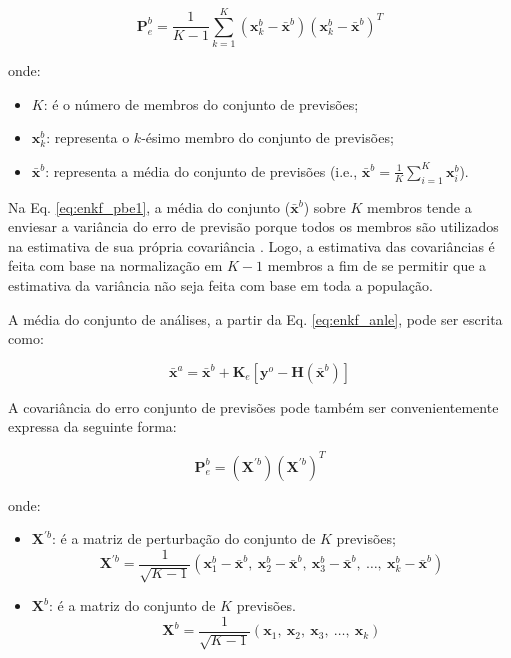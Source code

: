 \begin{equation}
    \label{eq:enkf_pbe1}
    {\mathbf{P}^{b}_{e}} = \frac{1}{K-1}\sum_{k=1}^{K}({\mathbf{x}^{b}_{k}}-\mathbf{\bar{x}}^{b})({\mathbf{x}^{b}_{k}}-\mathbf{\bar{x}}^{b})^{T}
\end{equation}

onde:

\begin{itemize}
    \item $K$: é o número de membros do conjunto de previsões;
    \item ${\mathbf{x}^{b}_{k}}$: representa o $k$-ésimo membro do conjunto de previsões;
    \item $\mathbf{\bar{x}}^{b}$: representa a média do conjunto de previsões (i.e., $\mathbf{\bar{x}}^{b} =  \frac{1}{K}\sum_{i=1}^{K}\mathbf{x}^{b}_{i}$).
\end{itemize}

Na Eq. \ref{eq:enkf_pbe1}, a média do conjunto ($\mathbf{\bar{x}}^{b}$) sobre $K$ membros tende a enviesar a variância do erro de previsão porque todos os membros são utilizados na estimativa de sua própria covariância \cite{kalnay/2003}. Logo, a estimativa das covariâncias é feita com base na normalização em $K-1$ membros a fim de se permitir que a estimativa da variância não seja feita com base em toda a população. 

A média do conjunto de análises, a partir da Eq. \ref{eq:enkf_anle}, pode ser escrita como:

\begin{equation}
    \label{eq:enkf_anlmed}
    {\mathbf{{\bar{x}}}^{a}} = {\mathbf{{\bar{x}}}^{b}} + \mathbf{K}_{e}[\mathbf{y}^{o}-\mathbf{H}(\mathbf{\bar{x}}^{b})]
\end{equation}

A covariância do erro conjunto de previsões pode também ser convenientemente expressa da seguinte forma:

\begin{equation}
    \label{eq:enkf_pbe2}
    {\mathbf{P}^{b}_{e}} = (\mathbf{X}^{\prime{b}})(\mathbf{X}^{\prime{b}})^{T}
\end{equation}

onde:

\begin{itemize}
    \item $\mathbf{X}^{\prime{b}}$: é a matriz de perturbação do conjunto de $K$ previsões;
    \begin{equation*}
        \mathbf{X}^{\prime{b}}=\frac{1}{\sqrt{K-1}}(\mathbf{x}^{b}_{1}-\mathbf{\bar{x}}^{b}, \  \mathbf{x}^{b}_{2}-\mathbf{\bar{x}}^{b}, \ \mathbf{x}^{b}_{3}-\mathbf{\bar{x}}^{b}, \ \ldots, \  \mathbf{x}^{b}_{k}-\mathbf{\bar{x}}^{b})
    \end{equation*}
    \item $\mathbf{X}^{b}$: é a matriz do conjunto de $K$ previsões.
    \begin{equation*}
        \mathbf{X}^{b}=\frac{1}{\sqrt{K-1}}(\mathbf{x}_{1}, \ \mathbf{x}_{2}, \ \mathbf{x}_{3}, \ \ldots, \  \mathbf{x}_{k})
    \end{equation*}
\end{itemize}

